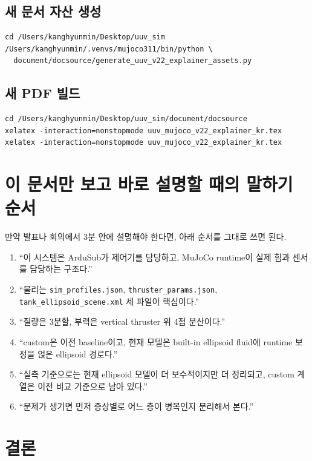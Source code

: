 \documentclass[11pt,a4paper]{article}
\newcommand{\code}[1]{\nolinkurl{#1}}
\begin{document}
\subsection{새 문서 자산 생성}

\begin{verbatim}
cd /Users/kanghyunmin/Desktop/uuv_sim
/Users/kanghyunmin/.venvs/mujoco311/bin/python \
  document/docsource/generate_uuv_v22_explainer_assets.py
\end{verbatim}

\subsection{새 PDF 빌드}

\begin{verbatim}
cd /Users/kanghyunmin/Desktop/uuv_sim/document/docsource
xelatex -interaction=nonstopmode uuv_mujoco_v22_explainer_kr.tex
xelatex -interaction=nonstopmode uuv_mujoco_v22_explainer_kr.tex
\end{verbatim}

\section{이 문서만 보고 바로 설명할 때의 말하기 순서}

만약 발표나 회의에서 3분 안에 설명해야 한다면, 아래 순서를 그대로 쓰면 된다.

\begin{enumerate}[leftmargin=2em]
  \item ``이 시스템은 ArduSub가 제어기를 담당하고, MuJoCo runtime이 실제 힘과 센서를 담당하는 구조다.''
  \item ``물리는 \code{sim\_profiles.json}, \code{thruster\_params.json}, \code{tank\_ellipsoid\_scene.xml} 세 파일이 핵심이다.''
  \item ``질량은 3분할, 부력은 vertical thruster 위 4점 분산이다.''
  \item ``custom은 이전 baseline이고, 현재 모델은 built-in ellipsoid fluid에 runtime 보정을 얹은 ellipsoid 경로다.''
  \item ``실측 기준으로는 현재 ellipsoid 모델이 더 보수적이지만 더 정리되고, custom 계열은 이전 비교 기준으로 남아 있다.''
  \item ``문제가 생기면 먼저 증상별로 어느 층이 병목인지 분리해서 본다.'' 
\end{enumerate}

\section{결론}
\end{document}

